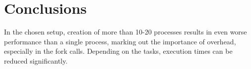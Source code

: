 \documentclass[a4paper]{article}
\begin{document}
\section{Conclusions}

In the chosen setup, creation of more than 10-20 processes results in even worse performance than a single process, marking out the importance of overhead, especially in the fork calls. Depending on the tasks, execution times can be reduced significantly.

% 

\end{document}
